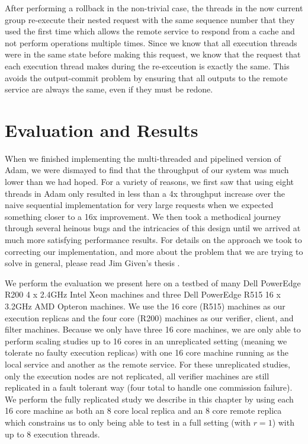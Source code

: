 \documentclass[11pt, oneside]{report}
\begin{document}
After performing a rollback in the non-trivial case, the threads in the now current group re-execute their nested request with the same sequence number that they used the first time which allows the remote service to respond from a cache and not perform operations multiple times.
Since we know that all execution threads were in the same state before making this request, we know that the request that each execution thread makes during the re-exceution is exactly the same. This avoids the output-commit problem by ensuring that all outputs to the remote service are always the same, even if they must be redone.

\chapter{Evaluation and Results}\label{AdamResults}

When we finished implementing the multi-threaded and pipelined version of Adam, we were dismayed to find that the throughput of our system was much lower than we had hoped. 
For a variety of reasons, we first saw that using eight threads in Adam only resulted in less than a 4x throughput increase over the naive sequential implementation for very large requests when we expected something closer to a 16x improvement. 
We then took a methodical journey through several heinous bugs and the intricacies of this design until we arrived at much more satisfying performance results. 
For details on the approach we took to correcting our implementation, and more about the problem that we are trying to solve in general, please read Jim Given's thesis \cite{jim}.

We perform the evaluation we present here on a testbed of many Dell PowerEdge R200 4 x 2.4GHz Intel Xeon machines and three Dell PowerEdge R515 16 x 3.2GHz AMD Opteron machines. 
We use the 16 core (R515) machines as our execution replicas and the four core (R200) machines as our verifier, client, and filter machines. 
Because we only have three 16 core machines, we are only able to perform scaling studies up to 16 cores in an unreplicated setting (meaning we tolerate no faulty execution replicas) with one 16 core machine running as the local service and another as the remote service. 
For these unreplicated studies, only the execution nodes are not replicated, all verifier machines are still replicated in a fault tolerant way (four total to handle one commission failure). 
We perform the fully replicated study we describe in this chapter by using each 16 core machine as both an 8 core local replica and an 8 core remote replica which constrains us to only being able to test in a full setting (with $r = 1$) with up to 8 execution threads.
\end{document}
